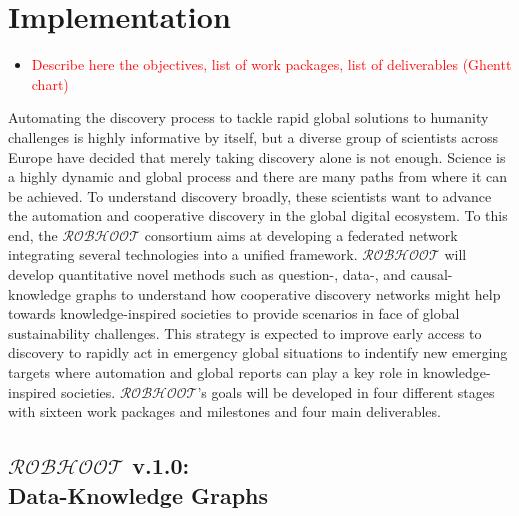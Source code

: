 \documentclass[11pt, a4paper]{article} %
\begin{document}
\section{Implementation}

\begin{itemize}
\item \textcolor{red}{Describe here the objectives, list of work
    packages, list of deliverables (Ghentt chart)}
\end{itemize}
    
Automating the discovery process to tackle rapid global solutions to
humanity challenges is highly informative by itself, but a diverse
group of scientists across Europe have decided that merely taking
discovery alone is not enough. Science is a highly dynamic and global
process and there are many paths from where it can be achieved. To
understand discovery broadly, these scientists want to advance the
automation and cooperative discovery in the global digital
ecosystem. To this end, the $\mathcal{ROBHOOT}$ consortium aims at
developing a federated network integrating several technologies into a
unified framework. $\mathcal{ROBHOOT}$ will develop quantitative novel
methods such as question-, data-, and causal-knowledge graphs to
understand how cooperative discovery networks might help towards
knowledge-inspired societies to provide scenarios in face of global
sustainability challenges. This strategy is expected to improve early
access to discovery to rapidly act in emergency global situations to
indentify new emerging targets where automation and global reports can
play a key role in knowledge-inspired societies. $\mathcal{ROBHOOT}$'s
goals will be developed in four different stages with sixteen work
packages and milestones and four main deliverables.

\subsection{{\bf $\mathcal{ROBHOOT}$ v.1.0}: \\ Data-Knowledge Graphs}
\end{document}
